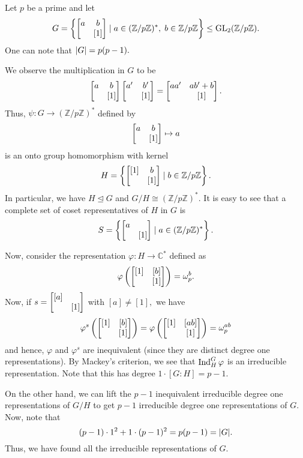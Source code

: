 \begin{ex}
	Let $p$ be a prime and let
	\begin{equation*} 
		G = \left\{\begin{bmatrix} a & b \\  & [1] \end{bmatrix} \mid a \in (\mathbb{Z}/p\mathbb{Z})^*,\; b \in \mathbb{Z}/p\mathbb{Z}\right\} \le \operatorname{GL}_2(\mathbb{Z}/p\mathbb{Z}).
	\end{equation*}
	One can note that ${\left\lvert G \right\lvert} = p(p - 1).$

	We observe the multiplication in $G$ to be
	\begin{equation*} 
		\begin{bmatrix} a & b \\  & [1] \end{bmatrix}\begin{bmatrix} a' & b' \\  & [1] \end{bmatrix} = \begin{bmatrix} aa' & ab' + b \\  & [1] \end{bmatrix}.
	\end{equation*}
	Thus, $\psi : G \to (\mathbb{Z}/p\mathbb{Z})^*$ defined by
	\begin{equation*} 
		\begin{bmatrix} a & b \\  & [1] \end{bmatrix} \mapsto a
	\end{equation*}
	is an onto group homomorphism with kernel
	\begin{equation*} 
		H = \left\{\begin{bmatrix} [1] & b \\  & [1] \end{bmatrix} \mid b \in \mathbb{Z}/p\mathbb{Z}\right\}.
	\end{equation*}
	In particular, we have $H \unlhd G$ and $G/H \cong (\mathbb{Z}/p\mathbb{Z})^*.$ It is easy to see that a complete set of coset representatives of $H$ in $G$ is 
	\begin{equation*} 
		S = \left\{\begin{bmatrix} a &  \\  & [1] \end{bmatrix} \mid a \in (\mathbb{Z}/p\mathbb{Z})^*\right\}.
	\end{equation*}

	Now, consider the representation $\varphi : H \to \mathbb{C}^*$ defined as
	\begin{equation*} 
		\varphi\left(\begin{bmatrix} [1] & [b] \\  & [1] \end{bmatrix}\right) = \omega_p^b.
	\end{equation*}
	Now, if $s = \begin{bmatrix} [a] &  \\  & [1] \end{bmatrix}$ with $[a] \neq [1],$ we have
	\begin{equation*} 
		\varphi^s\left(\begin{bmatrix} [1] & [b] \\  & [1] \end{bmatrix}\right) = \varphi\left(\begin{bmatrix} [1] & [ab] \\  & [1] \end{bmatrix}\right) = \omega_p^{ab}
	\end{equation*}
	and hence, $\varphi$ and $\varphi^s$ are inequivalent (since they are distinct degree one representations). By Mackey's criterion, we see that $\operatorname{Ind}^{G}_{H}\varphi$ is an irreducible representation. Note that this has degree $1\cdot[G : H] = p - 1.$

	On the other hand, we can lift the $p - 1$ inequivalent irreducible degree one representations of $G/H$ to get $p - 1$ irreducible degree one representations of $G.$ Now, note that
	\begin{equation*} 
		(p - 1)\cdot1^2 + 1\cdot(p - 1)^2 = p(p - 1) = {\left\lvert G \right\lvert}.
	\end{equation*}
	Thus, we have found all the irreducible representations of $G.$
\end{ex}